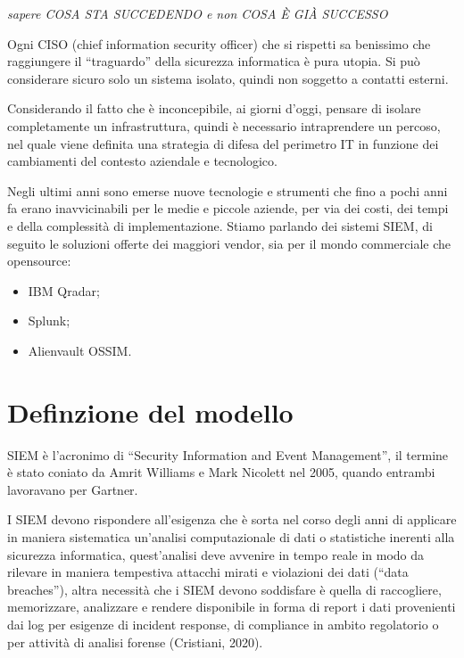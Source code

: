 \begin{center}
    \textit{sapere COSA STA SUCCEDENDO e non COSA È GIÀ SUCCESSO}
\end{center}

Ogni CISO (chief information security officer) che si rispetti sa benissimo che raggiungere il “traguardo” della sicurezza informatica è pura utopia. Si può considerare sicuro solo un sistema isolato, quindi non soggetto a contatti esterni.\par 
Considerando il fatto che è inconcepibile, ai giorni d’oggi, pensare di isolare completamente un infrastruttura, quindi è necessario intraprendere un percoso, nel quale viene definita una strategia di difesa del perimetro IT in funzione dei cambiamenti del contesto aziendale e tecnologico.

Negli ultimi anni sono emerse nuove tecnologie e strumenti che fino a pochi anni fa erano inavvicinabili per le medie e piccole aziende, per via dei costi, dei tempi e della complessità di implementazione.
Stiamo parlando dei sistemi SIEM, di seguito le soluzioni offerte dei maggiori vendor, sia per il mondo commerciale che opensource:



\begin{itemize}
    \item{IBM Qradar}; 
    \item{Splunk};
    \item{Alienvault OSSIM}.
\end{itemize}

\section{Definzione del modello}
\label{sec:Definzione del modello}

SIEM è l’acronimo di “Security Information and Event Management”, il termine è stato coniato da Amrit Williams e Mark Nicolett nel 2005, quando entrambi lavoravano per Gartner.\par
I SIEM devono rispondere all’esigenza che è sorta nel corso degli anni di applicare in maniera sistematica un’analisi computazionale di dati o statistiche inerenti alla sicurezza informatica, quest’analisi deve avvenire in tempo reale in modo da rilevare in maniera tempestiva attacchi mirati e violazioni dei dati (“data breaches”), altra necessità che i SIEM devono soddisfare è quella di raccogliere, memorizzare, analizzare e rendere disponibile in forma di report i dati provenienti dai log per esigenze di incident response, di compliance in ambito regolatorio o per attività di analisi forense (Cristiani, 2020).

